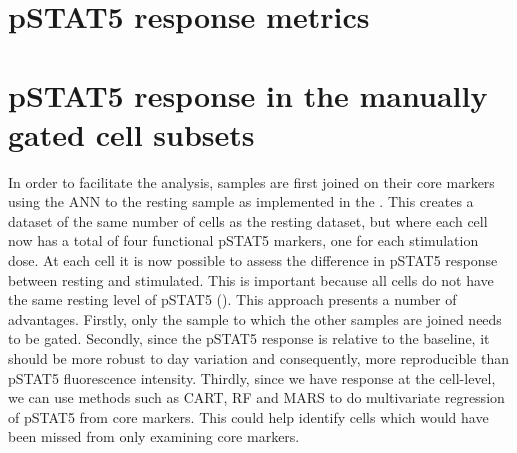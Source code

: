 %
%


\section{pSTAT5 response metrics}





\section{pSTAT5 response in the manually gated cell subsets}


In order to facilitate the analysis, samples are first joined on their core markers using the \gls{ANN} to the resting sample \citep{Jones:2011ez}
as implemented in the .
This creates a dataset of the same number of cells as the resting dataset, but where each cell now has a total of four functional pSTAT5 markers,
one for each stimulation dose.
At each cell it is now possible to assess the difference in pSTAT5 response between resting and stimulated.
This is important because all cells do not have the same resting level of pSTAT5 ().
This approach presents a number of advantages.
Firstly, only the sample to which the other samples are joined needs to be gated.
Secondly, since the pSTAT5 response is relative to the baseline, it should be more robust to day variation
and consequently, more reproducible than pSTAT5 fluorescence intensity.
Thirdly, since we have response at the cell-level, we can use methods
such as \gls{CART}, \gls{RF} and \gls{MARS} to do multivariate regression of pSTAT5 from core markers.
This could help identify cells which would have been missed from only examining core markers.

